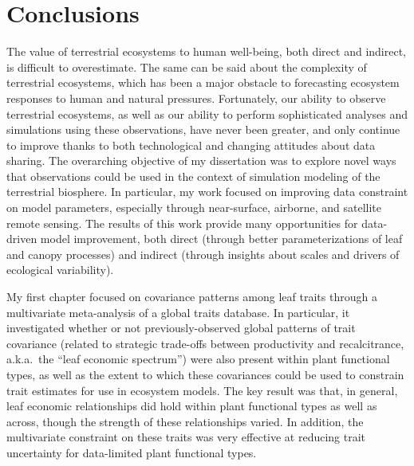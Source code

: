 \chapter{Conclusions}
\label{chapter:Conclusions}
\thispagestyle{myheadings}

The value of terrestrial ecosystems to human well-being, both direct and indirect, is difficult to overestimate.
The same can be said about the complexity of terrestrial ecosystems, which has been a major obstacle to forecasting ecosystem responses to human and natural pressures.
Fortunately, our ability to observe terrestrial ecosystems, as well as our ability to perform sophisticated analyses and simulations using these observations, have never been greater, and only continue to improve thanks to both technological and changing attitudes about data sharing.
The overarching objective of my dissertation was to explore novel ways that observations could be used in the context of simulation modeling of the terrestrial biosphere.
In particular, my work focused on improving data constraint on model parameters, especially through near-surface, airborne, and satellite remote sensing.
The results of this work provide many opportunities for data-driven model improvement, both direct (through better parameterizations of leaf and canopy processes) and indirect (through insights about scales and drivers of ecological variability). 

My first chapter focused on covariance patterns among leaf traits through a multivariate meta-analysis of a global traits database.
In particular, it investigated whether or not previously-observed global patterns of trait covariance (related to strategic trade-offs between productivity and recalcitrance, a.k.a.\ the ``leaf economic spectrum'') were also present within plant functional types, as well as the extent to which these covariances could be used to constrain trait estimates for use in ecosystem models.
The key result was that, in general, leaf economic relationships did hold within plant functional types as well as across, though the strength of these relationships varied.
In addition, the multivariate constraint on these traits was very effective at reducing trait uncertainty for data-limited plant functional types.


